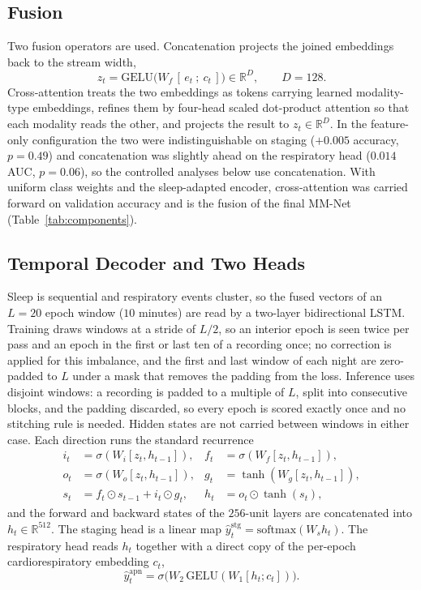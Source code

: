 \documentclass[a4paper,fleqn]{cas-sc}
\begin{document}
\subsection{Fusion}
Two fusion operators are used. Concatenation projects the joined embeddings back to the
stream width,
\begin{equation}
z_t=\mathrm{GELU}\!\big(W_f\,[\,e_t\ ;\ c_t\,]\big)\in\mathbb{R}^{D},\qquad D=128.
\end{equation}
Cross-attention treats the two embeddings as tokens carrying learned modality-type
embeddings, refines them by four-head scaled dot-product attention so that each modality
reads the other, and projects the result to $z_t\in\mathbb{R}^{D}$. In the feature-only
configuration the two were indistinguishable on staging ($+0.005$ accuracy, $p=0.49$) and
concatenation was slightly ahead on the respiratory head ($0.014$ AUC, $p=0.06$), so the
controlled analyses below use concatenation. With uniform class weights and the
sleep-adapted encoder, cross-attention was carried forward on validation accuracy and is the
fusion of the final MM-Net (Table~\ref{tab:components}).

\subsection{Temporal Decoder and Two Heads}
Sleep is sequential and respiratory events cluster, so the fused vectors of an $L=20$ epoch
window ($10$ minutes) are read by a two-layer bidirectional LSTM. Training draws windows at a stride of $L/2$, so an interior epoch is seen twice per pass and an epoch in the first or last ten of a recording once; no correction is applied for this imbalance, and the first and last window of each night are zero-padded to $L$ under a mask that removes the padding from the loss.
Inference uses disjoint windows: a recording is padded to a multiple of $L$, split into
consecutive blocks, and the padding discarded, so every epoch is scored exactly once and no
stitching rule is needed. Hidden states are not carried between windows in either case.
Each direction runs the
standard recurrence
\begin{align}
i_t&=\sigma(W_i[z_t,h_{t-1}]), & f_t&=\sigma(W_f[z_t,h_{t-1}]),\nonumber\\
o_t&=\sigma(W_o[z_t,h_{t-1}]), & g_t&=\tanh(W_g[z_t,h_{t-1}]),\\
s_t&=f_t\odot s_{t-1}+i_t\odot g_t, & h_t&=o_t\odot\tanh(s_t),\nonumber
\end{align}
and the forward and backward states of the $256$-unit layers are concatenated into
$h_t\in\mathbb{R}^{512}$. The
staging head is a linear map $\hat y^{\mathrm{stg}}_t=\mathrm{softmax}(W_s h_t)$. The
respiratory head reads $h_t$ together with a direct copy of the per-epoch cardiorespiratory
embedding $c_t$,
\begin{equation}
\hat y^{\mathrm{apn}}_t=\sigma\!\big(W_2\,\mathrm{GELU}(W_1[h_t;c_t])\big).
\end{equation}
\end{document}
